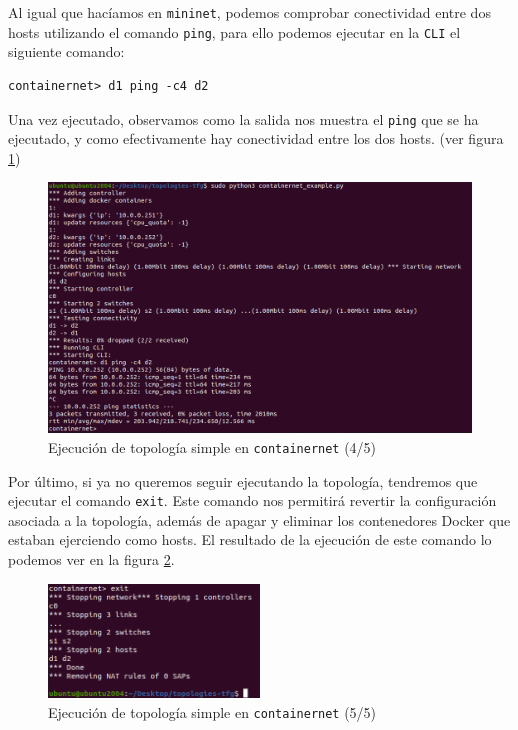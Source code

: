 \documentclass[a4paper, oneside, 12pt]{book}
\begin{document}
	\pagebreak

	\noindent Al igual que hacíamos en \texttt{mininet}, podemos comprobar conectividad entre dos hosts utilizando el comando \texttt{ping}, para ello podemos ejecutar en la \texttt{CLI} el siguiente comando:
	\begin{verbatim}
containernet> d1 ping -c4 d2
	\end{verbatim}

	\noindent Una vez ejecutado, observamos como la salida nos muestra el \texttt{ping} que se ha ejecutado, y como efectivamente hay conectividad entre los dos hosts. (ver figura \ref{img: cn simple 4})

	\begin{figure}[h!]
		\begin{center}
			\includegraphics[width=1\textwidth]{img/cn_example4.png}
			\caption{Ejecución de topología simple en \texttt{containernet} (4/5)}
			\label{img: cn simple 4}
		\end{center}
	\end{figure}

	\noindent Por último, si ya no queremos seguir ejecutando la topología, tendremos que ejecutar el comando \texttt{exit}. Este comando nos permitirá revertir la configuración asociada a la topología, además de apagar y eliminar los contenedores Docker que estaban ejerciendo como hosts. El resultado de la ejecución de este comando lo podemos ver en la figura \ref{img: cn simple 5}.


	\begin{figure}[h!]
		\begin{center}
			\includegraphics[width=0.5\textwidth]{img/cn_example5.png}
			\caption{Ejecución de topología simple en \texttt{containernet} (5/5)}
			\label{img: cn simple 5}
		\end{center}
	\end{figure}
	
\end{document}
